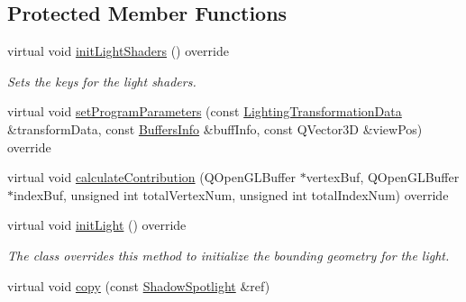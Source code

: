 \subsection*{Protected Member Functions}
\begin{DoxyCompactItemize}
\item 
\mbox{\label{class_geometry_engine_1_1_geometry_world_item_1_1_geometry_light_1_1_shadow_spotlight_aa4de61784b3cdb56739255fbcc00818c}} 
virtual void \mbox{\hyperlink{class_geometry_engine_1_1_geometry_world_item_1_1_geometry_light_1_1_shadow_spotlight_aa4de61784b3cdb56739255fbcc00818c}{init\+Light\+Shaders}} () override
\begin{DoxyCompactList}\small\item\em Sets the keys for the light shaders. \end{DoxyCompactList}\item 
virtual void \mbox{\hyperlink{class_geometry_engine_1_1_geometry_world_item_1_1_geometry_light_1_1_shadow_spotlight_af274f65e3b888dd73ad7d89efdbe5ce4}{set\+Program\+Parameters}} (const \mbox{\hyperlink{class_geometry_engine_1_1_lighting_transformation_data}{Lighting\+Transformation\+Data}} \&transform\+Data, const \mbox{\hyperlink{class_geometry_engine_1_1_buffers_info}{Buffers\+Info}} \&buff\+Info, const Q\+Vector3D \&view\+Pos) override
\item 
virtual void \mbox{\hyperlink{class_geometry_engine_1_1_geometry_world_item_1_1_geometry_light_1_1_shadow_spotlight_a27163f2f8903220d7eaae7aa70c9d6e6}{calculate\+Contribution}} (Q\+Open\+G\+L\+Buffer $\ast$vertex\+Buf, Q\+Open\+G\+L\+Buffer $\ast$index\+Buf, unsigned int total\+Vertex\+Num, unsigned int total\+Index\+Num) override
\item 
\mbox{\label{class_geometry_engine_1_1_geometry_world_item_1_1_geometry_light_1_1_shadow_spotlight_a93e2c91b4377ecb98cf4c0409364c7be}} 
virtual void \mbox{\hyperlink{class_geometry_engine_1_1_geometry_world_item_1_1_geometry_light_1_1_shadow_spotlight_a93e2c91b4377ecb98cf4c0409364c7be}{init\+Light}} () override
\begin{DoxyCompactList}\small\item\em The class overrides this method to initialize the bounding geometry for the light. \end{DoxyCompactList}\item 
virtual void \mbox{\hyperlink{class_geometry_engine_1_1_geometry_world_item_1_1_geometry_light_1_1_shadow_spotlight_a675183375855625b787de617239aa6fb}{copy}} (const \mbox{\hyperlink{class_geometry_engine_1_1_geometry_world_item_1_1_geometry_light_1_1_shadow_spotlight}{Shadow\+Spotlight}} \&ref)
\end{DoxyCompactItemize}
